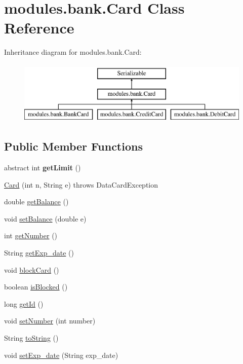 \hypertarget{classmodules_1_1bank_1_1_card}{}\section{modules.\+bank.\+Card Class Reference}
\label{classmodules_1_1bank_1_1_card}
Inheritance diagram for modules.\+bank.\+Card\+:\begin{figure}[H]
\begin{center}
\leavevmode
\includegraphics[height=3.000000cm]{classmodules_1_1bank_1_1_card}
\end{center}
\end{figure}
\subsection*{Public Member Functions}
\begin{DoxyCompactItemize}
\item 
\mbox{\label{classmodules_1_1bank_1_1_card_a386f72c5b038bc8d80d10fd77b2c8db3}} 
abstract int {\bfseries get\+Limit} ()
\item 
\mbox{\hyperlink{classmodules_1_1bank_1_1_card_a19e7ab54952594ea01d2f79bc984b4d1}{Card}} (int n, String e)  throws Data\+Card\+Exception
\item 
double \mbox{\hyperlink{classmodules_1_1bank_1_1_card_a62067906bc5ee5295a3e141cd4e9b9e8}{get\+Balance}} ()
\item 
void \mbox{\hyperlink{classmodules_1_1bank_1_1_card_a535c0ca771797c3d788fb1db64b16d15}{set\+Balance}} (double e)
\item 
int \mbox{\hyperlink{classmodules_1_1bank_1_1_card_a4d1b385624f4b1a3d2bea7a88082f4f3}{get\+Number}} ()
\item 
String \mbox{\hyperlink{classmodules_1_1bank_1_1_card_a4a06523d1698faecc6fb2f2c2345f810}{get\+Exp\+\_\+date}} ()
\item 
void \mbox{\hyperlink{classmodules_1_1bank_1_1_card_a2836bec99670bb580486005abfa86cac}{block\+Card}} ()
\item 
boolean \mbox{\hyperlink{classmodules_1_1bank_1_1_card_a2f5180fdbd0c6f73d1fb87af19a1f4be}{is\+Blocked}} ()
\item 
long \mbox{\hyperlink{classmodules_1_1bank_1_1_card_a91869b7c3dad648eb2470f27b0bb8a26}{get\+Id}} ()
\item 
void \mbox{\hyperlink{classmodules_1_1bank_1_1_card_a86370f2515d7612de7da603be14bad44}{set\+Number}} (int number)
\item 
String \mbox{\hyperlink{classmodules_1_1bank_1_1_card_aad416f3b110c7e08f3294b1b0cfd58d2}{to\+String}} ()
\item 
void \mbox{\hyperlink{classmodules_1_1bank_1_1_card_aa51b9d8df455d47e167192a911ca883b}{set\+Exp\+\_\+date}} (String exp\+\_\+date)
\end{DoxyCompactItemize}
